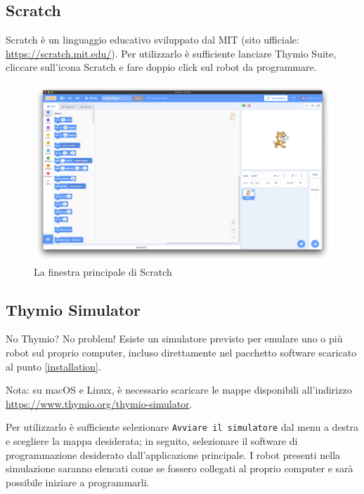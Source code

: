 \documentclass[12pt]{article}
\begin{document}
	\newpage
		
	\subsection{Scratch}
	
		Scratch è un linguaggio educativo sviluppato dal MIT (sito ufficiale: \url{https://scratch.mit.edu/}). Per utilizzarlo è sufficiente lanciare Thymio Suite, cliccare sull'icona Scratch e fare doppio click sul robot da programmare.
		
		\begin{figure}[H]
			\includegraphics[width=\textwidth]{img/scratch.png}
			\caption{La finestra principale di Scratch}
			\label{main_scratch}
		\end{figure}
		
	\subsection{Thymio Simulator}
	
		No Thymio? No problem! Esiste un simulatore previsto per emulare uno o più robot sul proprio computer, incluso direttamente nel pacchetto software scaricato al punto \ref{installation}.
		
		Nota: su macOS e Linux, è necessario scaricare le mappe disponibili all'indirizzo \url{https://www.thymio.org/thymio-simulator}.
		
		Per utilizzarlo è sufficiente selezionare \texttt{Avviare il simulatore} dal menu a destra e scegliere la mappa desiderata; in seguito, selezionare il software di programmazione desiderato dall'applicazione principale.
		I robot presenti nella simulazione saranno elencati come se fossero collegati al proprio computer e sarà possibile iniziare a programmarli.
		
\end{document}
